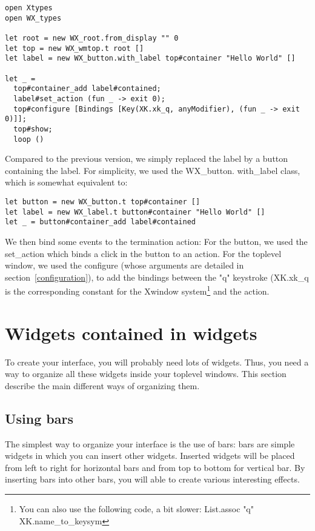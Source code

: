 \documentclass{report}
\begin{document}
\begin{verbatim}
open Xtypes
open WX_types

let root = new WX_root.from_display "" 0
let top = new WX_wmtop.t root []
let label = new WX_button.with_label top#container "Hello World" []

let _ =
  top#container_add label#contained;
  label#set_action (fun _ -> exit 0);
  top#configure [Bindings [Key(XK.xk_q, anyModifier), (fun _ -> exit 0)]];
  top#show;
  loop () 
\end{verbatim}

  Compared to the previous version, we simply replaced the label by a button
containing the label. For simplicity, we used the {\sf WX\_button.
with\_label} class, which is somewhat equivalent to:

\begin{verbatim}
let button = new WX_button.t top#container []
let label = new WX_label.t button#container "Hello World" []
let _ = button#container_add label#contained
\end{verbatim}

 We then bind some events to the termination action: For the button, we used
the {\sf set\_action} which binds a click in the button to an action. For the
toplevel window, we used the {\sf configure} (whose arguments are detailed in
section~\ref{configuration}), to add the bindings between the "q" keystroke
(XK.xk\_q is the corresponding constant for the Xwindow system\footnote{You
can also use the following code, a bit slower:
{\sf  List.assoc "q" XK.name\_to\_keysym}} and the action.

\section{Widgets contained in widgets}

To create your interface, you will probably need lots of widgets.  Thus, 
you need a way to organize all these widgets inside your toplevel windows.
This section describe the main different ways of organizing them. 

\subsection{Using bars}

 The simplest way to organize your interface is the use of bars: bars are 
simple widgets in which you can insert other widgets. Inserted widgets 
will be placed from left to right for horizontal bars and from top to 
bottom for vertical bar. By inserting bars into other bars, you will able 
to create various interesting effects.
\end{document}
